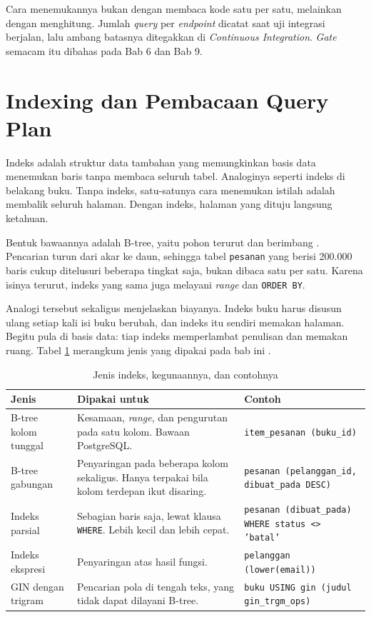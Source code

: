 Cara menemukannya bukan dengan membaca kode satu per satu, melainkan dengan
menghitung. Jumlah \textit{query} per \textit{endpoint} dicatat saat uji integrasi
berjalan, lalu ambang batasnya ditegakkan di \textit{Continuous Integration}.
\textit{Gate} semacam itu dibahas pada Bab 6 dan Bab 9.

\section{Indexing dan Pembacaan Query Plan}

Indeks adalah struktur data tambahan yang memungkinkan basis data menemukan
baris tanpa membaca seluruh tabel. Analoginya seperti indeks di belakang buku.
Tanpa indeks, satu-satunya cara menemukan istilah adalah membalik seluruh
halaman. Dengan indeks, halaman yang dituju langsung ketahuan.

Bentuk bawaannya adalah B-tree, yaitu pohon terurut dan berimbang
\cite{pgdoc-indexes}. Pencarian turun dari akar ke daun, sehingga tabel
\texttt{pesanan} yang berisi 200.000 baris cukup ditelusuri beberapa tingkat
saja, bukan dibaca satu per satu. Karena isinya terurut, indeks yang sama juga
melayani \textit{range} dan \texttt{ORDER BY}.

Analogi tersebut sekaligus menjelaskan biayanya. Indeks buku harus disusun
ulang setiap kali isi buku berubah, dan indeks itu sendiri memakan halaman.
Begitu pula di basis data: tiap indeks memperlambat penulisan dan memakan
ruang. Tabel \ref{tab:jenis-indeks} merangkum jenis yang dipakai pada bab ini
\cite{pgdoc-indexes}.

\begin{table}[!htb]
  \centering
  \caption{Jenis indeks, kegunaannya, dan contohnya}
  \label{tab:jenis-indeks}
  \begin{tabularx}{\textwidth}{lXX}
    \hline
    \textbf{Jenis} & \textbf{Dipakai untuk} & \textbf{Contoh} \\
    \hline
    B-tree kolom tunggal & Kesamaan, \textit{range}, dan pengurutan pada satu kolom. Bawaan PostgreSQL. & \texttt{item\_pesanan (buku\_id)} \\
    \hline
    B-tree gabungan & Penyaringan pada beberapa kolom sekaligus. Hanya terpakai bila kolom terdepan ikut disaring. & \texttt{pesanan (pelanggan\_id, dibuat\_pada DESC)} \\
    \hline
    Indeks parsial & Sebagian baris saja, lewat klausa \texttt{WHERE}. Lebih kecil dan lebih cepat. & \texttt{pesanan (dibuat\_pada) WHERE status <> 'batal'} \\
    \hline
    Indeks ekspresi & Penyaringan atas hasil fungsi. & \texttt{pelanggan (lower(email))} \\
    \hline
    GIN dengan trigram & Pencarian pola di tengah teks, yang tidak dapat dilayani B-tree. & \texttt{buku USING gin (judul gin\_trgm\_ops)} \\
    \hline
  \end{tabularx}
\end{table}

